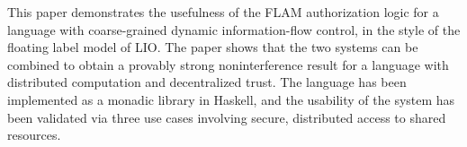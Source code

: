 This paper demonstrates the usefulness of the FLAM authorization logic for a language with coarse-grained dynamic information-flow control, in the style of the floating label model of LIO. The paper shows that the two systems can be combined to obtain a provably strong noninterference result for a language with distributed computation and decentralized trust. The language has been implemented as a monadic library in Haskell, and the usability of the system has been validated via three use cases involving secure, distributed access to shared resources.